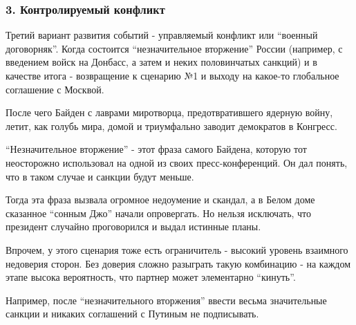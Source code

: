  
 
 
 
 

\subsubsection{3. Контролируемый конфликт}
\label{sec:12_02_2022.stz.news.ua.strana.1.vojna_nachnetsja_15_fevralja.6.three}

Третий вариант развития событий - управляемый конфликт или \enquote{военный
договорняк}. Когда состоится \enquote{незначительное вторжение} России (например, с
введением войск на Донбасс, а затем и неких половинчатых санкций) и в качестве
итога - возвращение к сценарию №1 и выходу на какое-то глобальное соглашение с
Москвой.

После чего Байден с лаврами миротворца, предотвратившего ядерную войну, летит,
как голубь мира, домой и триумфально заводит демократов в Конгресс.

\enquote{Незначительное вторжение} - этот фраза самого Байдена, которую тот
неосторожно использовал на одной из своих пресс-конференций. Он дал понять, что
в таком случае и санкции будут меньше. 

Тогда эта фраза вызвала огромное недоумение и скандал, а в Белом доме сказанное
\enquote{сонным Джо} начали опровергать. Но нельзя исключать, что президент
случайно проговорился и выдал истинные планы. 

Впрочем, у этого сценария тоже есть ограничитель - высокий уровень взаимного
недоверия сторон. Без доверия сложно разыграть такую комбинацию - на каждом
этапе высока вероятность, что партнер может элементарно \enquote{кинуть}. 

Например, после \enquote{незначительного вторжения} ввести весьма значительные
санкции и никаких соглашений с Путиным не подписывать. 
